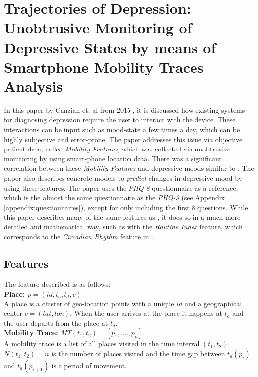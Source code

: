 \section{Trajectories of Depression: Unobtrusive Monitoring of Depressive States by means of Smartphone Mobility Traces Analysis} 

In this paper by Canzian et. al from 2015 \cite{Canzian2015}, it is discussed how existing systems for diagnosing depression require the user to interact with the device. These interactions can be input such as mood-state a few times a day, which can be highly subjective and error-prone. The paper addresses this issue via objective patient data, called \textit{Mobility Features}, which was collected via unobtrusive monitoring by using smart-phone location data. There was a significant correlation between these \textit{Mobility Features} and depressive moods similar to \cite{Saeb2015}. The paper also describes concrete models to \textit{predict} changes in depressive mood by using these features. The paper uses the \textit{PHQ-8} questionnaire as a reference, which is the almost the same questionnaire as the \textit{PHQ-9} (see Appendix \ref{appendix:questionnaires}), except for only including the first 8 questions. While this paper describes many of the same features as \cite{Saeb2015}, it does so in a much more detailed and mathematical way, such as with the \textit{Routine Index} feature, which corresponds to the \textit{Circadian Rhythm} feature in \cite{Saeb2015}.

\subsection{Features}
The feature described is as follows:\\

\textbf{Place: $p = (id, t_a, t_d, c)$}\\
A place is a cluster of geo-location points with a unique $id$ and a geographical center $c = (lat, lon)$. When the user arrives at the place it happens at $t_a$ and the user departs from the place at $t_d$. \\

\textbf{Mobility Trace: $MT(t_1, t_2) = [p_1, ...., p_n]$}\\
A mobility trace is a list of all places visited in the time interval $(t_1, t_2)$. $N(t_1, t_2) = n$ is the number of places visited and the time gap between $t_d (p_i)$ and $t_a (p_{i+1})$ is a period of movement.\\

